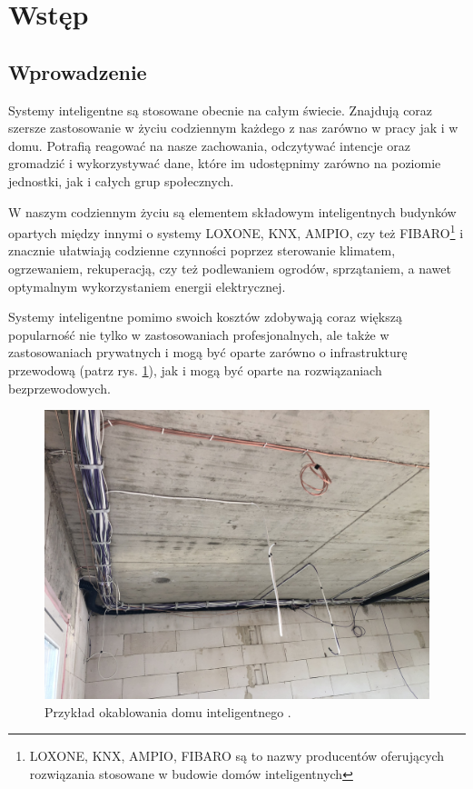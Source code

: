 \documentclass[a4paper,12pt,reqno]{article}
\begin{document}
\newpage

%
%
\section{Wstęp} \label{section:wstep}

\subsection{Wprowadzenie}

Systemy inteligentne są stosowane obecnie na całym świecie. Znajdują coraz szersze zastosowanie w życiu codziennym każdego z nas zarówno w pracy jak i w domu. Potrafią reagować na nasze zachowania, odczytywać intencje oraz gromadzić i wykorzystywać dane, które im udostępnimy zarówno na poziomie jednostki, jak i całych grup społecznych.

W naszym codziennym życiu są elementem składowym inteligentnych budynków opartych między innymi o systemy LOXONE, KNX, AMPIO, czy też FIBARO\footnote{LOXONE, KNX, AMPIO, FIBARO są to nazwy producentów oferujących rozwiązania stosowane w budowie domów inteligentnych} i znacznie ułatwiają codzienne czynności poprzez sterowanie klimatem, ogrzewaniem, rekuperacją, czy też podlewaniem ogrodów, sprzątaniem, a nawet optymalnym wykorzystaniem energii elektrycznej.

Systemy inteligentne pomimo swoich kosztów zdobywają coraz większą popularność nie tylko w zastosowaniach profesjonalnych, ale także w zastosowaniach prywatnych i mogą być oparte zarówno o infrastrukturę przewodową (patrz rys. \ref{kable}), jak i mogą być oparte na rozwiązaniach bezprzewodowych.

\begin{figure}[H]%
\centering
\includegraphics[width=0.8\columnwidth]{imgs/domkable.jpg}
\caption{Przykład okablowania domu inteligentnego \cite{img_me}. \label{kable}}
\quad
\end{figure}
\end{document}
